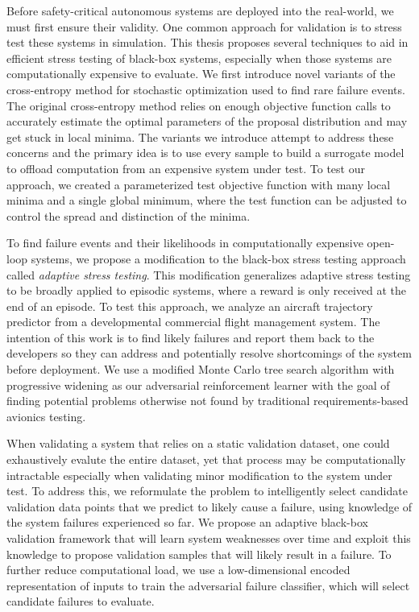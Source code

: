 Before safety-critical autonomous systems are deployed into the real-world, we must first ensure their validity.
One common approach for validation is to stress test these systems in simulation.
This thesis proposes several techniques to aid in efficient stress testing of black-box systems, especially when those systems are computationally expensive to evaluate.
We first introduce novel variants of the cross-entropy method for stochastic optimization used to find rare failure events.
The original cross-entropy method relies on enough objective function calls to accurately estimate the optimal parameters of the proposal distribution and may get stuck in local minima.
The variants we introduce attempt to address these concerns and the primary idea is to use every sample to build a surrogate model to offload computation from an expensive system under test.
To test our approach, we created a parameterized test objective function with many local minima and a single global minimum, where the test function can be adjusted to control the spread and distinction of the minima.

To find failure events and their likelihoods in computationally expensive open-loop systems, we propose a modification to the black-box stress testing approach called \textit{adaptive stress testing}.
This modification generalizes adaptive stress testing to be broadly applied to episodic systems, where a reward is only received at the end of an episode.
To test this approach, we analyze an aircraft trajectory predictor from a developmental commercial flight management system.
The intention of this work is to find likely failures and report them back to the developers so they can address and potentially resolve shortcomings of the system before deployment. 
We use a modified Monte Carlo tree search algorithm with progressive widening as our adversarial reinforcement learner with the goal of finding potential problems otherwise not found by traditional requirements-based avionics testing.

When validating a system that relies on a static validation dataset, one could exhaustively evalute the entire dataset, yet that process may be computationally intractable especially when validating minor modification to the system under test.
To address this, we reformulate the problem to intelligently select candidate validation data points that we predict to likely cause a failure, using knowledge of the system failures experienced so far.
We propose an adaptive black-box validation framework that will learn system weaknesses over time and exploit this knowledge to propose validation samples that will likely result in a failure.
To further reduce computational load, we use a low-dimensional encoded representation of inputs to train the adversarial failure classifier, which will select candidate failures to evaluate.

